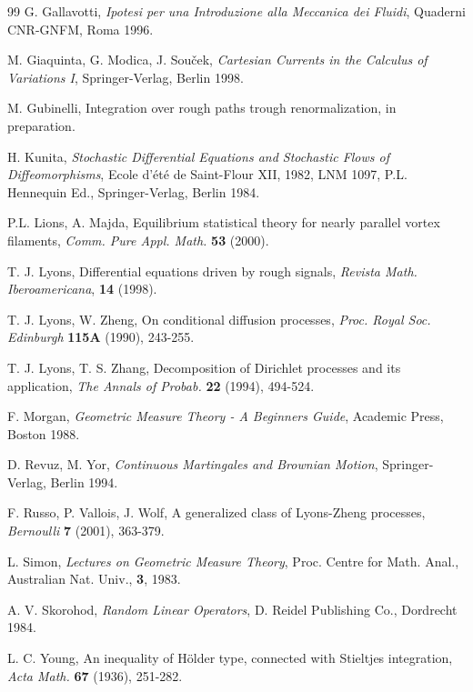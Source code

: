 \documentclass{article}
\begin{document}
\begin{thebibliography}{99}
  G. Gallavotti, \textit{Ipotesi per una Introduzione alla
Meccanica dei Fluidi}, Quaderni CNR-GNFM, Roma 1996.

  M. Giaquinta, G. Modica, J. Sou\v{c}ek,
  \textit{Cartesian Currents in the Calculus of Variations I}, 
Springer-Verlag, Berlin 1998.

 M. Gubinelli, Integration
  over rough paths trough renormalization, in preparation.

  H. Kunita, \textit{Stochastic Differential Equations and
Stochastic Flows of Diffeomorphisms}, Ecole d'\'{e}t\'{e} de Saint-Flour
XII, 1982, LNM 1097, P.L. Hennequin Ed., Springer-Verlag, Berlin 1984.

  P.L. Lions, A. Majda, Equilibrium statistical theory for
nearly parallel vortex filaments, \textit{Comm. Pure Appl. Math.} \textbf{53}
(2000).

  T. J. Lyons, Differential equations driven by rough
signals, \textit{Revista Math. Iberoamericana}, \textbf{14} (1998).

  T. J. Lyons, W. Zheng, On conditional diffusion processes, 
\textit{Proc. Royal Soc. Edinburgh} \textbf{115A} (1990), 243-255.

  T. J. Lyons, T. S. Zhang, Decomposition of Dirichlet
processes and its application, \textit{The Annals of Probab.} \textbf{22}
(1994), 494-524.

  F. Morgan, \textit{Geometric Measure Theory - A Beginners
Guide}, Academic Press, Boston 1988.

  D. Revuz, M. Yor, \textit{Continuous Martingales and Brownian
Motion}, Springer-Verlag, Berlin 1994.

  F. Russo, P. Vallois, J. Wolf, A generalized class of
Lyons-Zheng processes, \textit{Bernoulli} \textbf{7} (2001), 363-379.

  L. Simon, \textit{Lectures on Geometric Measure Theory},
Proc. Centre for Math. Anal., Australian Nat. Univ., \textbf{3}, 1983.

  A. V. Skorohod, \textit{Random Linear Operators}, 
D. Reidel Publishing Co., Dordrecht 1984.

  L. C. Young, An inequality of H\"{o}lder type, connected
with Stieltjes integration, \textit{Acta Math.} \textbf{67} (1936), 251-282.
\end{thebibliography}
\end{document}
